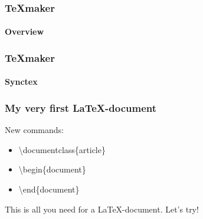 
\begin{frame}
\frametitle{TeXmaker}
\framesubtitle{Overview}

\end{frame}


\begin{frame}
\frametitle{TeXmaker}
\framesubtitle{Synctex}

\end{frame}

\begin{frame}
\frametitle{My very first \LaTeX -document}
\begin{block}{New commands:}
\begin{itemize}
\item \begin{ttfamily}\color{nounibaredII}\textbackslash documentclass\color{nounibagreenI}\color{black}\{article\}\end{ttfamily}
\item \begin{ttfamily}\color{unibablueI}\textbackslash begin\color{black}\{document\}\end{ttfamily}
\item \begin{ttfamily}\color{unibablueI}\textbackslash end\color{black}\{document\}\end{ttfamily}
\end{itemize}
\end{block}
This is all you need for a \LaTeX -document. Let's try!

\end{frame}

